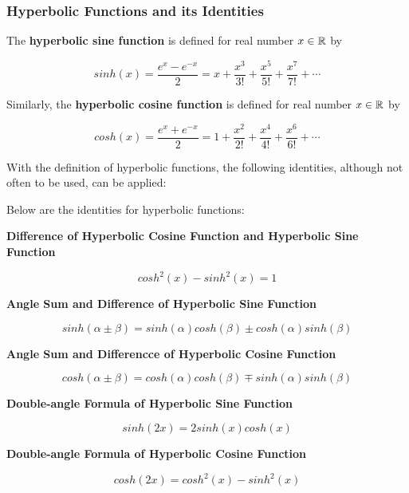 \documentclass[a4paper,12pt]{article}
\begin{document}
\subsubsection{Hyperbolic Functions and its Identities}
\begin{dft}
  The \textbf{hyperbolic sine function} is defined for real number $x\in \mathbb{R}$ by

  $$sinh(x)=\frac{e^{x}-e^{-x}}{2}=x+\frac{x^{3}}{3!}+\frac{x^{5}}{5!}+\frac{x^{7}}{7!}+\cdots$$

  Similarly, the \textbf{hyperbolic cosine function} is defined for real number $x\in \mathbb{R}$ by

  $$cosh(x)=\frac{e^{x}+e^{-x}}{2}=1+\frac{x^{2}}{2!}+\frac{x^{4}}{4!}+\frac{x^{6}}{6!}+\cdots$$
\end{dft}\n

With the definition of hyperbolic functions, the following identities, although not often to be used, can be applied:\n

\begin{thm}
  Below are the identities for hyperbolic functions:

  \begin{alist}
    \item \textbf{Difference of Hyperbolic Cosine Function and Hyperbolic Sine Function}

    $$cosh^{2}(x)-sinh^{2}(x)=1$$

    \item \textbf{Angle Sum and Difference of Hyperbolic Sine Function}

    $$sinh(\alpha\pm \beta)=sinh(\alpha)cosh(\beta)\pm cosh(\alpha)sinh(\beta)$$

    \item \textbf{Angle Sum and Differencce of Hyperbolic Cosine Function}

    $$cosh(\alpha\pm \beta)=cosh(\alpha)cosh(\beta)\mp sinh(\alpha)sinh(\beta)$$

    \item \textbf{Double-angle Formula of Hyperbolic Sine Function}

    $$sinh(2x)=2sinh(x)cosh(x)$$

    \item \textbf{Double-angle Formula of Hyperbolic Cosine Function}

    $$cosh(2x)=cosh^{2}(x)-sinh^{2}(x)$$

  \end{alist}
\end{thm}\n
\end{document}
